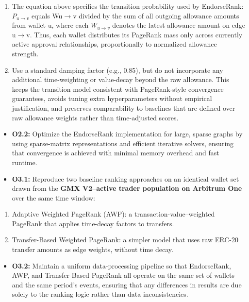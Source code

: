 \begin{enumerate}
\item[(b)] The equation above specifies the transition probability used by EndorseRank: $P_{u\to v}$ equals Wu\(\to\)v divided by the sum of all outgoing allowance amounts from wallet u, where each $W_{u\to v}$ denotes the latest allowance amount on edge u\(\to\)v. Thus, each wallet distributes its PageRank mass only across currently active approval relationships, proportionally to normalized allowance strength.
\item[(c)] Use a standard damping factor (e.g., 0.85), but do not incorporate any additional time-weighting or value-decay beyond the raw allowance. This keeps the transition model consistent with PageRank-style convergence guarantees, avoids tuning extra hyperparameters without empirical justification, and preserves comparability to baselines that are defined over raw allowance weights rather than time-adjusted scores.
\end{enumerate}
\begin{itemize}
\item[\textbullet] \textbf{O2.2: }Optimize the EndorseRank implementation for large, sparse graphs by using sparse-matrix representations and efficient iterative solvers, ensuring that convergence is achieved with minimal memory overhead and fast runtime.
\end{itemize}

\begin{itemize}
\item[\textbullet] \textbf{O3.1: }Reproduce two baseline ranking approaches on an identical wallet set drawn from the \textbf{GMX V2--active trader population on Arbitrum One} over the same time window:
\end{itemize}
\begin{enumerate}
\item[(a)] Adaptive Weighted PageRank (AWP): a transaction-value--weighted PageRank that applies time-decay factors to transfers.
\item[(b)] Transfer-Based Weighted PageRank: a simpler model that uses raw ERC-20 transfer amounts as edge weights, without time decay.
\end{enumerate}
\begin{itemize}
\item[\textbullet] \textbf{O3.2: }Maintain a uniform data-processing pipeline so that EndorseRank, AWP, and Transfer-Based PageRank all operate on the same set of wallets and the same period's events, ensuring that any differences in results are due solely to the ranking logic rather than data inconsistencies.
\end{itemize}

